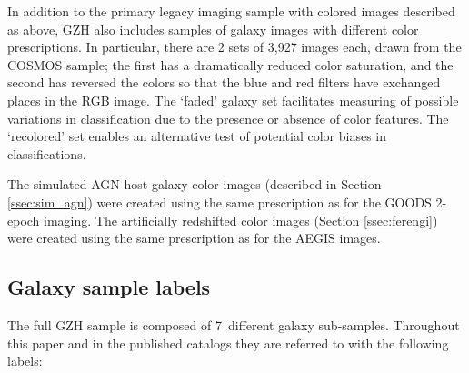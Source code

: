 \documentclass[twocolumn]{aastex6}
\begin{document}
In addition to the primary \hst{} legacy imaging sample with colored images
described as above, GZH also includes samples of \hst{} galaxy images with
different color prescriptions. In particular, there are 2 sets of 3,927 images
each, drawn from the COSMOS sample; the first has a dramatically reduced color
saturation, and the second has reversed the colors so that the blue and red
filters have exchanged places in the RGB image. The `faded' galaxy set
facilitates measuring of possible variations in classification due to the
presence or absence of color features. The `recolored' set enables an
alternative test of potential color biases in classifications.

The simulated AGN host galaxy color images (described in Section \ref{ssec:sim_agn})
were created using the same prescription as for the GOODS 2-epoch imaging. The
artificially redshifted color images (Section \ref{ssec:ferengi}) were created using the
same prescription as for the AEGIS images.


\subsection{Galaxy sample labels}\label{ssec:sample_labels}

The full GZH sample is composed of 7~different galaxy sub-samples. Throughout
this paper and in the published catalogs they are referred to with the
following labels:
\end{document}
